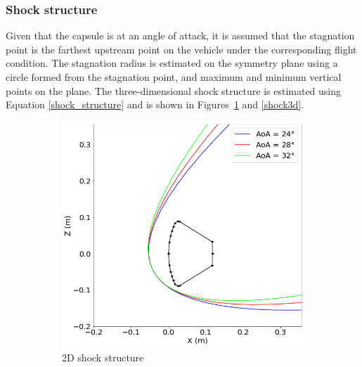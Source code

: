 \documentclass[%
 aip,
 amsmath,amssymb,
preprint,%
]{revtex4-1}
\begin{document}
\subsubsection{Shock structure}
Given that the capsule is at an angle of attack, it is assumed that the stagnation point is the farthest upstream point on the vehicle under the corresponding flight condition. The stagnation radius is estimated on the symmetry plane using a circle formed from the stagnation point, and maximum and minimum vertical points on the plane. The three-dimensional shock structure is estimated using Equation \eqref{shock_structure} and is shown in Figures~\ref{shock2d} and \ref{shock3d}.

\begin{figure}[h!]
\centering
\begin{subfigure}[b]{0.49\textwidth}
\centering
\includegraphics[width=\textwidth]{shock2D.png}
\caption{2D shock structure}
\label{shock2d}
\end{subfigure}
~
\begin{subfigure}[b]{0.49\textwidth}
\centering

\end{subfigure}
\end{figure}
\end{document}
